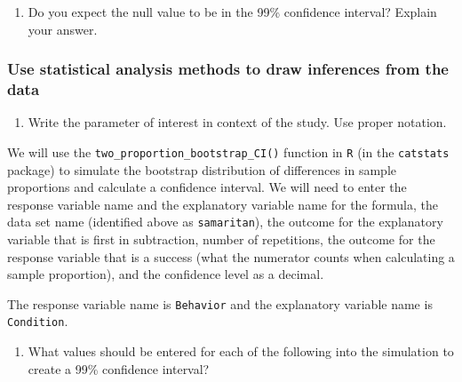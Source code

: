 \documentclass[
]{report}
\providecommand{\tightlist}{%
  \setlength{\itemsep}{0pt}\setlength{\parskip}{0pt}}
\begin{document}
\vspace{0.8in}

\begin{enumerate}
\def\labelenumi{\arabic{enumi}.}
\setcounter{enumi}{4}
\tightlist
\item
  Do you expect the null value to be in the 99\% confidence interval? Explain your answer.
\end{enumerate}

\vspace{0.8in}

\hypertarget{use-statistical-analysis-methods-to-draw-inferences-from-the-data-2}{%
\subsubsection*{Use statistical analysis methods to draw inferences from the data}\label{use-statistical-analysis-methods-to-draw-inferences-from-the-data-2}}

\begin{enumerate}
\def\labelenumi{\arabic{enumi}.}
\setcounter{enumi}{5}
\tightlist
\item
  Write the parameter of interest in context of the study. Use proper notation.
\end{enumerate}

\vspace{1in}

We will use the \texttt{two\_proportion\_bootstrap\_CI()} function in \texttt{R} (in the \texttt{catstats} package) to simulate the bootstrap distribution of differences in sample proportions and calculate a confidence interval. We will need to enter the response variable name and the explanatory variable name for the formula, the data set name (identified above as \texttt{samaritan}), the outcome for the explanatory variable that is first in subtraction, number of repetitions, the outcome for the response variable that is a success (what the numerator counts when calculating a sample proportion), and the confidence level as a decimal.

The response variable name is \texttt{Behavior} and the explanatory variable name is \texttt{Condition}.

\begin{enumerate}
\def\labelenumi{\arabic{enumi}.}
\setcounter{enumi}{6}
\tightlist
\item
  What values should be entered for each of the following into the simulation to create a 99\% confidence interval?
\end{enumerate}
\end{document}
